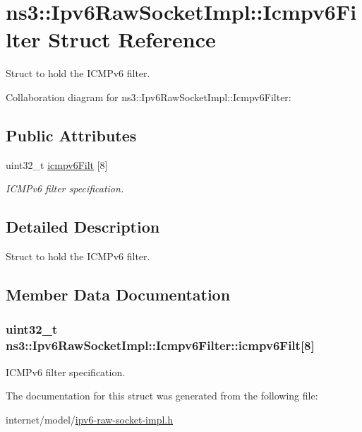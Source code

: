 \hypertarget{structns3_1_1Ipv6RawSocketImpl_1_1Icmpv6Filter}{}\section{ns3\+:\+:Ipv6\+Raw\+Socket\+Impl\+:\+:Icmpv6\+Filter Struct Reference}
\label{structns3_1_1Ipv6RawSocketImpl_1_1Icmpv6Filter}


Struct to hold the I\+C\+M\+Pv6 filter.  




Collaboration diagram for ns3\+:\+:Ipv6\+Raw\+Socket\+Impl\+:\+:Icmpv6\+Filter\+:
\subsection*{Public Attributes}
\begin{DoxyCompactItemize}
\item 
uint32\+\_\+t \hyperlink{structns3_1_1Ipv6RawSocketImpl_1_1Icmpv6Filter_a301eafaaac249d6da9cb3ed5d64062d8}{icmpv6\+Filt} \mbox{[}8\mbox{]}
\begin{DoxyCompactList}\small\item\em I\+C\+M\+Pv6 filter specification. \end{DoxyCompactList}\end{DoxyCompactItemize}


\subsection{Detailed Description}
Struct to hold the I\+C\+M\+Pv6 filter. 

\subsection{Member Data Documentation}
\subsubsection[{\texorpdfstring{icmpv6\+Filt}{icmpv6Filt}}]{\setlength{\rightskip}{0pt plus 5cm}uint32\+\_\+t ns3\+::\+Ipv6\+Raw\+Socket\+Impl\+::\+Icmpv6\+Filter\+::icmpv6\+Filt\mbox{[}8\mbox{]}}\hypertarget{structns3_1_1Ipv6RawSocketImpl_1_1Icmpv6Filter_a301eafaaac249d6da9cb3ed5d64062d8}{}\label{structns3_1_1Ipv6RawSocketImpl_1_1Icmpv6Filter_a301eafaaac249d6da9cb3ed5d64062d8}


I\+C\+M\+Pv6 filter specification. 



The documentation for this struct was generated from the following file\+:\begin{DoxyCompactItemize}
\item 
internet/model/\hyperlink{ipv6-raw-socket-impl_8h}{ipv6-\/raw-\/socket-\/impl.\+h}\end{DoxyCompactItemize}
